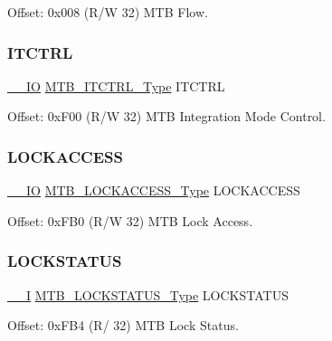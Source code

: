 Offset\+: 0x008 (R/W 32) M\+TB Flow. 

\mbox{\label{struct_mtb_a10ea54b49af479296049633735814110}} 
\subsubsection{\texorpdfstring{ITCTRL}{ITCTRL}}
{\footnotesize\ttfamily \mbox{\hyperlink{core__cm0plus_8h_aec43007d9998a0a0e01faede4133d6be}{\+\_\+\+\_\+\+IO}} \mbox{\hyperlink{union_m_t_b___i_t_c_t_r_l___type}{M\+T\+B\+\_\+\+I\+T\+C\+T\+R\+L\+\_\+\+Type}} I\+T\+C\+T\+RL}



Offset\+: 0x\+F00 (R/W 32) M\+TB Integration Mode Control. 

\mbox{\label{struct_mtb_a75c37ac080c67093d3b340f550f4ba91}} 
\subsubsection{\texorpdfstring{LOCKACCESS}{LOCKACCESS}}
{\footnotesize\ttfamily \mbox{\hyperlink{core__cm0plus_8h_aec43007d9998a0a0e01faede4133d6be}{\+\_\+\+\_\+\+IO}} \mbox{\hyperlink{union_m_t_b___l_o_c_k_a_c_c_e_s_s___type}{M\+T\+B\+\_\+\+L\+O\+C\+K\+A\+C\+C\+E\+S\+S\+\_\+\+Type}} L\+O\+C\+K\+A\+C\+C\+E\+SS}



Offset\+: 0x\+F\+B0 (R/W 32) M\+TB Lock Access. 

\mbox{\label{struct_mtb_af15d9c6990b0c16ab44c70f50a2e94d2}} 
\subsubsection{\texorpdfstring{LOCKSTATUS}{LOCKSTATUS}}
{\footnotesize\ttfamily \mbox{\hyperlink{core__cm0plus_8h_af63697ed9952cc71e1225efe205f6cd3}{\+\_\+\+\_\+I}} \mbox{\hyperlink{union_m_t_b___l_o_c_k_s_t_a_t_u_s___type}{M\+T\+B\+\_\+\+L\+O\+C\+K\+S\+T\+A\+T\+U\+S\+\_\+\+Type}} L\+O\+C\+K\+S\+T\+A\+T\+US}



Offset\+: 0x\+F\+B4 (R/ 32) M\+TB Lock Status. 

\mbox{\label{struct_mtb_ae46de36e16f88cf202a77610219287f3}} 

